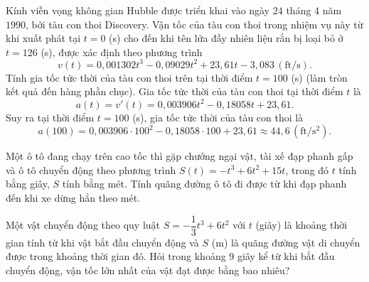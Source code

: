 \begin{ex}%
	Kính viễn vọng không gian Hubble được triển khai vào ngày $24$ tháng $4$ năm $1990$, bởi tàu con thoi Discovery. Vận tốc của tàu con thoi trong nhiệm vụ này từ khi xuất phát tại $t=0$ (s) cho đến khi tên lửa đầy nhiên liệu rắn bị loại bỏ ở $t=126$ (s), được xác định theo phương trình
	$$v(t)=0{,}001302t^3-0{,}09029t^2+23{,}61t-3{,}083\, (\text{ft}/\text{s}).$$
	Tính gia tốc tức thời của tàu con thoi trên tại thời điểm $t=100$ (s) (làm tròn kết quả đến hàng phần chục).
	\loigiai
	{
		Gia tốc tức thời của tàu con thoi tại thời điểm $t$ là $$a(t)=v'(t)=0{,}003906t^2-0{,}18058t+23{,}61.$$
		Suy ra tại thời điểm $t=100$ (s), gia tốc tức thời của tàu con thoi là $$a(100)=0{,}003906\cdot 100^2-0{,}18058\cdot 100+23{,}61\approx 44{,}6\, (\text{ft}/\text{s}^2).$$
	}
\end{ex}

\begin{ex}%
	Một ô tô đang chạy trên cao tốc thì gặp chướng ngại vật, tài xế đạp phanh gấp và ô tô chuyển động theo phương trình $S(t) =  - t^3 + 6t^2 + 15t$, trong đó $t$ tính bằng giây, $S$ tính bằng mét. Tính quãng đường ô tô đi được từ khi đạp phanh đến khi xe dừng hẳn theo mét. 
\end{ex}

\begin{ex}%
	Một vật chuyển động theo quy luật $S=-\dfrac{1}{3}t^3+6t^2$ với $t$ (giây) là khoảng thời gian tính từ khi vật bắt đầu chuyển động và $S$ (m) là quãng đường vật di chuyển được trong khoảng thời gian đó. Hỏi trong khoảng $9$ giây kể từ khi bắt đầu chuyển động, vận tốc lớn nhất của vật đạt được bằng bao nhiêu?
\end{ex}

